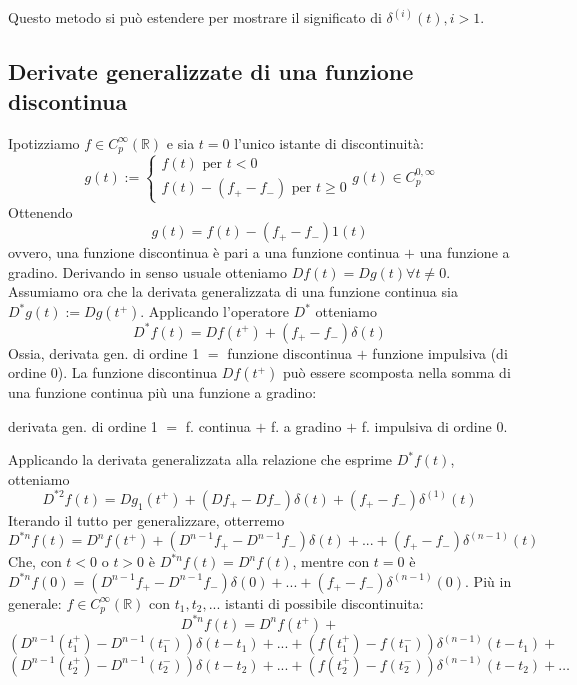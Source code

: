 \documentclass[11pt]{article}
\begin{document}
Questo metodo si può estendere per mostrare il significato di $\delta^{(i)} (t), i>1$.
\subsection{Derivate generalizzate di una funzione discontinua}
Ipotizziamo $f \in C_p^\infty(\mathbb{R})$ e sia $t=0$ l'unico istante di discontinuità:
\begin{displaymath}
    g(t) := \begin{cases}
        f(t) \textrm{ per } t<0 \\
        f(t)-(f_+ - f_-) \textrm{ per }t\ge0
    \end{cases}
    g(t) \in C_p^{0, \infty}
\end{displaymath}
Ottenendo
\begin{displaymath}
    g(t) = f(t) - (f_+ - f_-)1(t)
\end{displaymath}
ovvero, una funzione discontinua è pari a una funzione continua $+$ una funzione a gradino.
Derivando in senso usuale otteniamo $Df(t) = Dg(t) \forall t \neq 0$. Assumiamo ora che la derivata generalizzata di una funzione continua sia $D^* g(t) := Dg(t^+)$. Applicando l'operatore $D^*$ otteniamo
\begin{displaymath}
    D^* f(t) = Df(t^+) + (f_+ - f_-)\delta(t)
\end{displaymath}
Ossia, derivata gen. di ordine 1 $=$ funzione discontinua $+$ funzione impulsiva (di ordine 0). La funzione discontinua $Df(t^+)$ può essere scomposta nella somma di una funzione continua più una funzione a gradino:
\begin{center}
    derivata gen. di ordine 1 $=$ f. continua $+$ f. a gradino $+$ f. impulsiva di ordine 0.
\end{center}
Applicando la derivata generalizzata alla relazione che esprime $D^*f(t)$, otteniamo
\begin{displaymath}
    D^{*2} f(t) = Dg_1(t^+) + (Df_+ - Df_-)\delta(t) + (f_+ - f_-)\delta^{(1)}(t)
\end{displaymath}
Iterando il tutto per generalizzare, otterremo
\begin{displaymath}
    D^{*n} f(t) = D^n f(t^+) + (D^{n-1} f_+ - D^{n-1} f_-) \delta(t)+...+(f_+ - f_-)\delta^{(n-1)}(t)
\end{displaymath}
Che, con $t<0$ o $t>0$ è $D^{*n} f(t) = D^n f(t)$, mentre con $t=0$ è $D^{*n} f(0) = (D^{n-1} f_+ - D^{n-1} f_-) \delta(0) + ... + (f_+-f_-)\delta^{(n-1)}(0)$.
Più in generale: $f \in C_p^\infty (\mathbb{R})$ con $t_1,t_2,...$ istanti di possibile discontinuita:
\begin{displaymath}
    D^{*n} f(t) = D^n f(t^+)+\end{displaymath}\begin{displaymath}
    \left(D^{n-1}(t_1^+) - D^{n-1}(t_1^-)\right)\delta(t-t_1)+...+\left(f(t_1^+)-f(t_1^-)\right)\delta^{(n-1)}(t-t_1)+\end{displaymath}\begin{displaymath}
    \left(D^{n-1}(t_2^+) - D^{n-1}(t_2^-)\right)\delta(t-t_2)+...+\left(f(t_2^+)-f(t_2^-)\right)\delta^{(n-1)}(t-t_2)+\dots
\end{displaymath}
\end{document}
